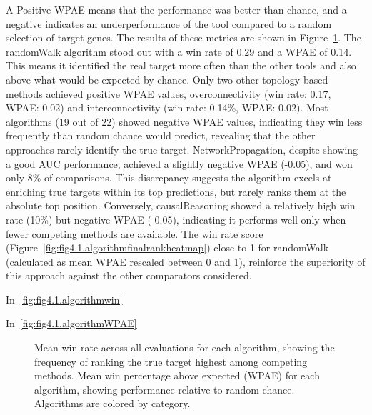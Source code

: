 A Positive WPAE means that the performance was better than chance, and a negative indicates an underperformance of the tool compared to a random selection of target genes. The results of these metrics are shown in Figure~\ref{fig:fig4.3.WinandWPAE}. The randomWalk algorithm stood out with a win rate of 0.29 and a WPAE of 0.14. This means it identified the real target more often than the other tools and also above what would be expected by chance. Only two other topology-based methods achieved positive WPAE values, overconnectivity (win rate: 0.17, WPAE: 0.02) and interconnectivity (win rate: 0.14\%, WPAE: 0.02).  Most algorithms (19 out of 22) showed negative WPAE values, indicating they win less frequently than random chance would predict, revealing that the other approaches rarely identify the true target. NetworkPropagation, despite showing a good \gls{AUC} performance, achieved a slightly negative WPAE (-0.05), and won only 8\% of comparisons. This discrepancy suggests the algorithm excels at enriching true targets within its top predictions, but rarely ranks them at the absolute top position. Conversely, causalReasoning showed a relatively high win rate (10\%) but negative WPAE (-0.05), indicating it performs well only when fewer competing methods are available. The win rate score (Figure~\ref{fig:fig4.1.algorithmfinalrankheatmap}) close to 1 for randomWalk (calculated as mean WPAE rescaled between 0 and 1), reinforce the superiority of this approach against the other comparators considered.

In~\ref{fig:fig4.1.algorithmwin}

In~\ref{fig:fig4.1.algorithmWPAE}

\begin{figure}[htbp]
  \centering
  \caption[Mean win rate across all evaluations for each algorithm.]{Mean win rate across all evaluations for each algorithm, showing the frequency of ranking the true target highest among competing methods. Mean win percentage above expected (WPAE) for each algorithm, showing performance relative to random chance. Algorithms are colored by category.}
  \label{fig:fig4.3.WinandWPAE}
\end{figure}


